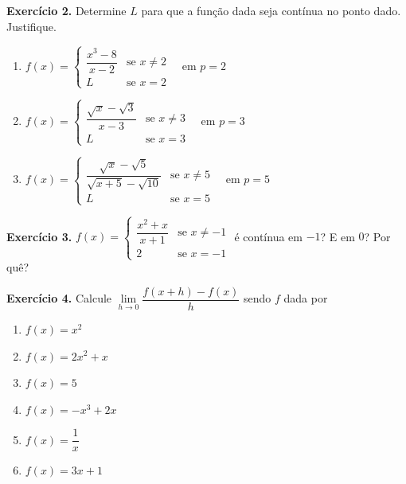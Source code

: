 \documentclass[12pt,a4paper]{article}
\begin{document}
\vspace{0.5cm}
\noindent\textbf{Exercício 2.} Determine $L$ para que a função dada seja contínua no ponto dado. Justifique.
\begin{enumerate}
    \renewcommand{\theenumi}{\alph{enumi}}
    \renewcommand{\labelenumi}{\theenumi)}
    \item $f(x) = \begin{cases} \dfrac{x^3 - 8}{x - 2} & \text{se } x \neq 2 \\ L & \text{se } x = 2 \end{cases} \quad \text{em } p = 2$
    \item $f(x) = \begin{cases} \dfrac{\sqrt{x} - \sqrt{3}}{x - 3} & \text{se } x \neq 3 \\ L & \text{se } x = 3 \end{cases} \quad \text{em } p = 3$
    \item $f(x) = \begin{cases} \dfrac{\sqrt{x} - \sqrt{5}}{\sqrt{x + 5} - \sqrt{10}} & \text{se } x \neq 5 \\ L & \text{se } x = 5 \end{cases} \quad \text{em } p = 5$
\end{enumerate}

\vspace{0.5cm}
\noindent\textbf{Exercício 3.}
$f(x) = \begin{cases} \dfrac{x^2 + x}{x + 1} & \text{se } x \neq -1 \\ 2 & \text{se } x = -1 \end{cases}$ é contínua em $-1$? E em $0$? Por quê?

\vspace{0.5cm}
\noindent\textbf{Exercício 4.} Calcule $\lim\limits_{h \to 0} \dfrac{f(x + h) - f(x)}{h}$ sendo $f$ dada por
\begin{enumerate}
    \renewcommand{\theenumi}{\alph{enumi}}
    \renewcommand{\labelenumi}{\theenumi)}
    \item $f(x) = x^2$
    \item $f(x) = 2x^2 + x$
    \item $f(x) = 5$
    \item $f(x) = -x^3 + 2x$
    \item $f(x) = \dfrac{1}{x}$
    \item $f(x) = 3x + 1$
\end{enumerate}
\end{document}
